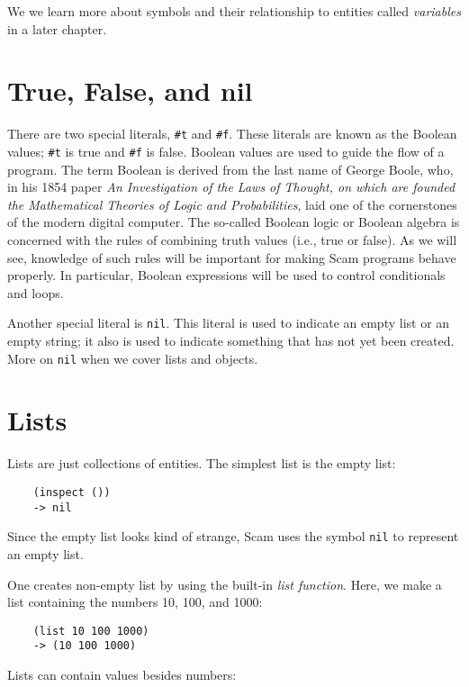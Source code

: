 We we learn more about symbols and their relationship to entities
called {\it variables} in a later chapter.

\section{True, False, and nil}

There are two special literals, \verb!#t!
and \verb!#f!.
These literals are known as the {\sc Boolean} values;
\verb!#t! is true and \verb!#f! is false.
Boolean values are used to guide the flow of a program.
The term {\sc Boolean} is derived from the last name of George Boole, who,
in his 1854 paper {\it An Investigation of the Laws of Thought, on which are
founded the Mathematical Theories of Logic and Probabilities}, laid one
of the cornerstones of the modern digital computer. The so-called {\sc Boolean}
logic or {\sc Boolean} algebra is concerned with the rules of combining truth
values (i.e., true or false). As we will see, knowledge of such rules will
be important for making Scam programs behave properly. In particular,
{\sc Boolean} expressions will be used to control conditionals and loops.

Another special literal is \verb!nil!.
This literal is used to
indicate an empty list or an empty string; it also is used
to indicate something that has not yet been
created. More on \verb!nil! when we cover lists and
objects.

\section{Lists}

Lists are just collections of entities.
The simplest list is the empty list:

\begin{verbatim}
    (inspect ())
    -> nil
\end{verbatim}

Since the empty list looks kind of strange, Scam uses the symbol \verb!nil!
to represent an empty list.

One creates non-empty list by
using the built-in {\it list function}. 
Here, we make a list containing the numbers
10, 100, and 1000:

\begin{verbatim}
    (list 10 100 1000)
    -> (10 100 1000)
\end{verbatim}

Lists can contain values besides numbers:

